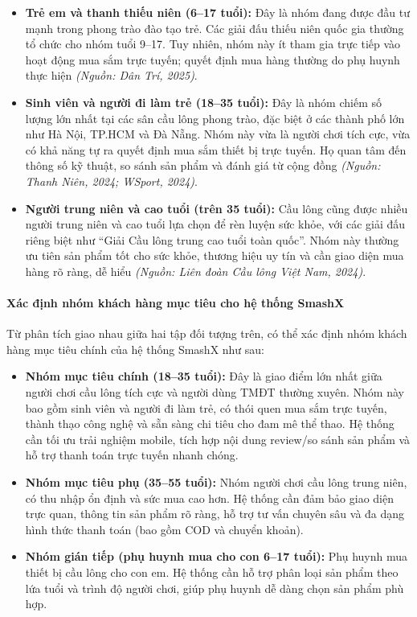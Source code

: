 \documentclass[13pt]{article}
\begin{document}
\begin{itemize}
    \item \textbf{Trẻ em và thanh thiếu niên (6--17 tuổi):} Đây là nhóm đang được đầu tư mạnh trong phong trào đào tạo trẻ. Các giải đấu thiếu niên quốc gia thường tổ chức cho nhóm tuổi 9--17. Tuy nhiên, nhóm này ít tham gia trực tiếp vào hoạt động mua sắm trực tuyến; quyết định mua hàng thường do phụ huynh thực hiện \textit{(Nguồn: Dân Trí, 2025)}.
    
    \item \textbf{Sinh viên và người đi làm trẻ (18--35 tuổi):} Đây là nhóm chiếm số lượng lớn nhất tại các sân cầu lông phong trào, đặc biệt ở các thành phố lớn như Hà Nội, TP.HCM và Đà Nẵng. Nhóm này vừa là người chơi tích cực, vừa có khả năng tự ra quyết định mua sắm thiết bị trực tuyến. Họ quan tâm đến thông số kỹ thuật, so sánh sản phẩm và đánh giá từ cộng đồng \textit{(Nguồn: Thanh Niên, 2024; WSport, 2024)}.
    
    \item \textbf{Người trung niên và cao tuổi (trên 35 tuổi):} Cầu lông cũng được nhiều người trung niên và cao tuổi lựa chọn để rèn luyện sức khỏe, với các giải đấu riêng biệt như ``Giải Cầu lông trung cao tuổi toàn quốc''. Nhóm này thường ưu tiên sản phẩm tốt cho sức khỏe, thương hiệu uy tín và cần giao diện mua hàng rõ ràng, dễ hiểu \textit{(Nguồn: Liên đoàn Cầu lông Việt Nam, 2024)}.
\end{itemize}

\paragraph{Xác định nhóm khách hàng mục tiêu cho hệ thống SmashX}

Từ phân tích giao nhau giữa hai tập đối tượng trên, có thể xác định nhóm khách hàng mục tiêu chính của hệ thống SmashX như sau:

\begin{itemize}
    \item \textbf{Nhóm mục tiêu chính (18--35 tuổi):} Đây là giao điểm lớn nhất giữa người chơi cầu lông tích cực và người dùng TMĐT thường xuyên. Nhóm này bao gồm sinh viên và người đi làm trẻ, có thói quen mua sắm trực tuyến, thành thạo công nghệ và sẵn sàng chi tiêu cho đam mê thể thao. Hệ thống cần tối ưu trải nghiệm mobile, tích hợp nội dung review/so sánh sản phẩm và hỗ trợ thanh toán trực tuyến nhanh chóng.
    
    \item \textbf{Nhóm mục tiêu phụ (35--55 tuổi):} Nhóm người chơi cầu lông trung niên, có thu nhập ổn định và sức mua cao hơn. Hệ thống cần đảm bảo giao diện trực quan, thông tin sản phẩm rõ ràng, hỗ trợ tư vấn chuyên sâu và đa dạng hình thức thanh toán (bao gồm COD và chuyển khoản).
    
    \item \textbf{Nhóm gián tiếp (phụ huynh mua cho con 6--17 tuổi):} Phụ huynh mua thiết bị cầu lông cho con em. Hệ thống cần hỗ trợ phân loại sản phẩm theo lứa tuổi và trình độ người chơi, giúp phụ huynh dễ dàng chọn sản phẩm phù hợp.
\end{itemize}
\end{document}
